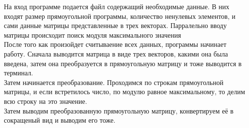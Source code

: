 \begin{spacing}{1}

\indent На вход программе подается файл содержащий необходимые данные. В них входят размер прямоугольной программы, 
количество ненулевых элементов, и сами данные матрицы представленные в трех векторах. 
Парралельно вводу матрицы происходит поиск модуля максимального значения\\
\indent После того как произойдет считываение всех данных, программы начинает работу. Сначала выводится матрица в виде трех векторов, 
какими она была введена, затем она преобразуется в прямоугольную матрицу и тоже выводится в терминал.\\
\indent Затем начинается преобразование. Проходимся по строкам прямоугольной матрицы, и если встретилось число, 
по модулю равное максимальному, то делим всю строку на это значение.\\
\indent Затем выводим преобразованную прямоугольную матрицу, конвертируем её в сокращеный вид и выводим его тоже.


\end{spacing}